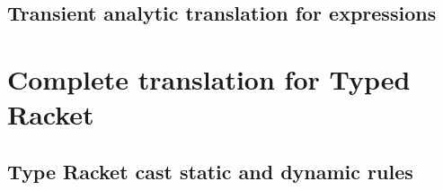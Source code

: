 \documentclass[a4paper,USenglish]{tex/lipics-v2016}
\begin{document}
\begin{mathpar}





\end{mathpar}

\subsection{Transient analytic translation for expressions}


\begin{mathpar}

\end{mathpar}

\section{Complete translation for Typed Racket}

\subsection{Type Racket cast static and dynamic rules}
\end{document}
